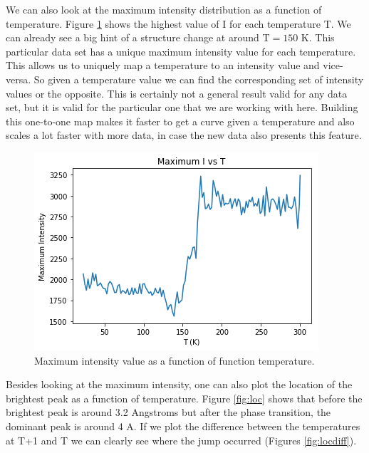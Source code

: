 We can also look at the maximum intensity distribution as a function of temperature. Figure \ref{fig:maxI} shows the highest value of I for each temperature T. We can already see a big hint of a structure change at around $\textrm{T} = 150 \textrm{ K}$. This particular data set has a unique maximum intensity value for each temperature. This allows us to uniquely map a temperature to an intensity value and vice-versa. So given a temperature value we can find the corresponding set of intensity values or the opposite.
This is certainly not a general result valid for any data set, but it is valid for the particular one that we are working with here. Building this one-to-one map makes it faster to get a curve given a temperature and also scales a lot faster with more data, in case the new data also presents this feature.

\begin{figure}[h]
  \centering
  \includegraphics[scale=0.25]{../figs/maxI.png}
  \caption{Maximum intensity value as a function of function temperature.}
  \label{fig:maxI}
\end{figure}

Besides looking at the maximum intensity, one can also plot the location of the brightest peak as a function of temperature. Figure \ref{fig:loc} shows that before the brightest peak is around 3.2 Angstroms but after the phase transition, the dominant peak is around 4 A. If we plot the difference between the temperatures at T+1 and T we can clearly see where the jump occurred (Figures \ref{fig:locdiff}).

